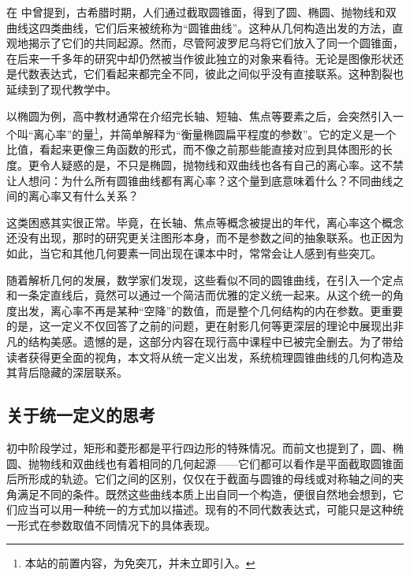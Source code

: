 

在 中曾提到，古希腊时期，人们通过截取圆锥面，得到了圆、椭圆、抛物线和双曲线这四类曲线，它们后来被统称为“圆锥曲线”。这种从几何构造出发的方法，直观地揭示了它们的共同起源。然而，尽管阿波罗尼乌将它们放入了同一个圆锥面，在后来一千多年的研究中却仍然被当作彼此独立的对象来看待。无论是图像形状还是代数表达式，它们看起来都完全不同，彼此之间似乎没有直接联系。这种割裂也延续到了现代教学中。

以椭圆为例，高中教材通常在介绍完长轴、短轴、焦点等要素之后，会突然引入一个叫“离心率”的量\footnote{本站的前置内容，为免突兀，并未立即引入。}，并简单解释为“衡量椭圆扁平程度的参数”。它的定义是一个比值，看起来更像三角函数的形式，而不像之前那些能直接对应到具体图形的长度。更令人疑惑的是，不只是椭圆，抛物线和双曲线也各有自己的离心率。这不禁让人想问：为什么所有圆锥曲线都有离心率？这个量到底意味着什么？不同曲线之间的离心率又有什么关系？

这类困惑其实很正常。毕竟，在长轴、焦点等概念被提出的年代，离心率这个概念还没有出现，那时的研究更关注图形本身，而不是参数之间的抽象联系。也正因为如此，当它和其他几何要素一同出现在课本中时，常常会让人感到有些突兀。

随着解析几何的发展，数学家们发现，这些看似不同的圆锥曲线，在引入一个定点和一条定直线后，竟然可以通过一个简洁而优雅的定义统一起来。从这个统一的角度出发，离心率不再是某种“空降”的数值，而是整个几何结构的内在参数。更重要的是，这一定义不仅回答了之前的问题，更在射影几何等更深层的理论中展现出非凡的结构美感。遗憾的是，这部分内容在现行高中课程中已被完全删去。为了带给读者获得更全面的视角，本文将从统一定义出发，系统梳理圆锥曲线的几何构造及其背后隐藏的深层联系。

\subsection{关于统一定义的思考}

初中阶段学过，矩形和菱形都是平行四边形的特殊情况。而前文也提到了，圆、椭圆、抛物线和双曲线也有着相同的几何起源——它们都可以看作是平面截取圆锥面后所形成的轨迹。它们之间的区别，仅仅在于截面与圆锥的母线或对称轴之间的夹角满足不同的条件。既然这些曲线本质上出自同一个构造，便很自然地会想到，它们应当可以用一种统一的方式加以描述。现有的不同代数表达式，可能只是这种统一形式在参数取值不同情况下的具体表现。

